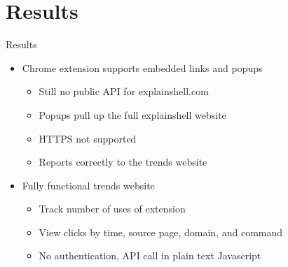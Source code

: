 \documentclass[xcolor=dvipsnames]{beamer}
\begin{document}
\section{Results}\label{results}
\begin{frame}{Results}
\begin{itemize}
\itemsep1pt\parskip0pt
\item
  Chrome extension supports embedded links and popups

  \begin{itemize}
  \itemsep1pt\parskip0pt
  \item
    Still no public API for explainshell.com
  \item
    Popups pull up the full explainshell website
  \item
    HTTPS not supported
  \item
    Reports correctly to the trends website
  \end{itemize}

\pause
\item
  Fully functional trends website

  \begin{itemize}
  \itemsep1pt\parskip0pt
  \item
    Track number of uses of extension
  \item
    View clicks by time, source page, domain, and command
  \item
    No authentication, API call in plain text Javascript
  \end{itemize}
\end{itemize}
\end{frame}
\end{document}
